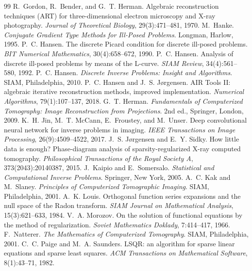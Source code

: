 \documentclass[11pt,a4paper]{article}
\numberwithin{equation}{section}
\theoremstyle{remark}
\begin{document}
\begin{thebibliography}{99}
 R.~Gordon, R.~Bender, and G.~T. Herman. Algebraic reconstruction techniques ({ART}) for three-dimensional electron microscopy and {X}-ray photography. \emph{Journal of Theoretical Biology}, 29(3):471--481, 1970.
 M.~Hanke. \emph{Conjugate Gradient Type Methods for Ill-Posed Problems}. Longman, Harlow, 1995.
 P.~C. Hansen. The discrete {P}icard condition for discrete ill-posed problems. \emph{BIT Numerical Mathematics}, 30(4):658--672, 1990.
 P.~C. Hansen. Analysis of discrete ill-posed problems by means of the {L}-curve. \emph{SIAM Review}, 34(4):561--580, 1992.
 P.~C. Hansen. \emph{Discrete Inverse Problems: Insight and Algorithms}. SIAM, Philadelphia, 2010.
 P.~C. Hansen and J.~S. J{\o}rgensen. {AIR Tools II}: algebraic iterative reconstruction methods, improved implementation. \emph{Numerical Algorithms}, 79(1):107--137, 2018.
 G.~T. Herman. \emph{Fundamentals of Computerized Tomography: Image Reconstruction from Projections}. 2nd ed., Springer, London, 2009.
 K.~H. Jin, M.~T. McCann, E.~Froustey, and M.~Unser. Deep convolutional neural network for inverse problems in imaging. \emph{IEEE Transactions on Image Processing}, 26(9):4509--4522, 2017.
 J.~S. J{\o}rgensen and E.~Y. Sidky. How little data is enough? {P}hase-diagram analysis of sparsity-regularized {X}-ray computed tomography. \emph{Philosophical Transactions of the Royal Society A}, 373(2043):20140387, 2015.
 J.~Kaipio and E.~Somersalo. \emph{Statistical and Computational Inverse Problems}. Springer, New York, 2005.
 A.~C. Kak and M.~Slaney. \emph{Principles of Computerized Tomographic Imaging}. SIAM, Philadelphia, 2001.
 A.~K. Louis. Orthogonal function series expansions and the null space of the {R}adon transform. \emph{SIAM Journal on Mathematical Analysis}, 15(3):621--633, 1984.
 V.~A. Morozov. On the solution of functional equations by the method of regularization. \emph{Soviet Mathematics Doklady}, 7:414--417, 1966.
 F.~Natterer. \emph{The Mathematics of Computerized Tomography}. SIAM, Philadelphia, 2001.
 C.~C. Paige and M.~A. Saunders. {LSQR}: an algorithm for sparse linear equations and sparse least squares. \emph{ACM Transactions on Mathematical Software}, 8(1):43--71, 1982.

\end{thebibliography}
\end{document}
